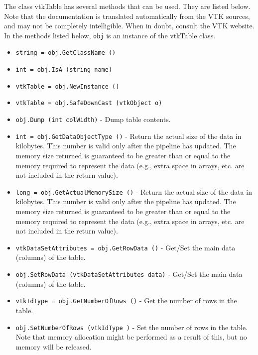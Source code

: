 The class vtkTable has several methods that can be used.
  They are listed below.
Note that the documentation is translated automatically from the VTK sources,
and may not be completely intelligible.  When in doubt, consult the VTK website.
In the methods listed below, \verb|obj| is an instance of the vtkTable class.
\begin{itemize}
\item  \verb|string = obj.GetClassName ()|

\item  \verb|int = obj.IsA (string name)|

\item  \verb|vtkTable = obj.NewInstance ()|

\item  \verb|vtkTable = obj.SafeDownCast (vtkObject o)|

\item  \verb|obj.Dump (int colWidth)| -  Dump table contents.

\item  \verb|int = obj.GetDataObjectType ()| -  Return the actual size of the data in kilobytes. This number
 is valid only after the pipeline has updated. The memory size
 returned is guaranteed to be greater than or equal to the
 memory required to represent the data (e.g., extra space in
 arrays, etc. are not included in the return value).

\item  \verb|long = obj.GetActualMemorySize ()| -  Return the actual size of the data in kilobytes. This number
 is valid only after the pipeline has updated. The memory size
 returned is guaranteed to be greater than or equal to the
 memory required to represent the data (e.g., extra space in
 arrays, etc. are not included in the return value).

\item  \verb|vtkDataSetAttributes = obj.GetRowData ()| -  Get/Set the main data (columns) of the table.

\item  \verb|obj.SetRowData (vtkDataSetAttributes data)| -  Get/Set the main data (columns) of the table.

\item  \verb|vtkIdType = obj.GetNumberOfRows ()| -  Get the number of rows in the table.

\item  \verb|obj.SetNumberOfRows (vtkIdType )| -  Set the number of rows in the table. Note that memory allocation might be performed
 as a result of this, but no memory will be released. 


\end{itemize}
